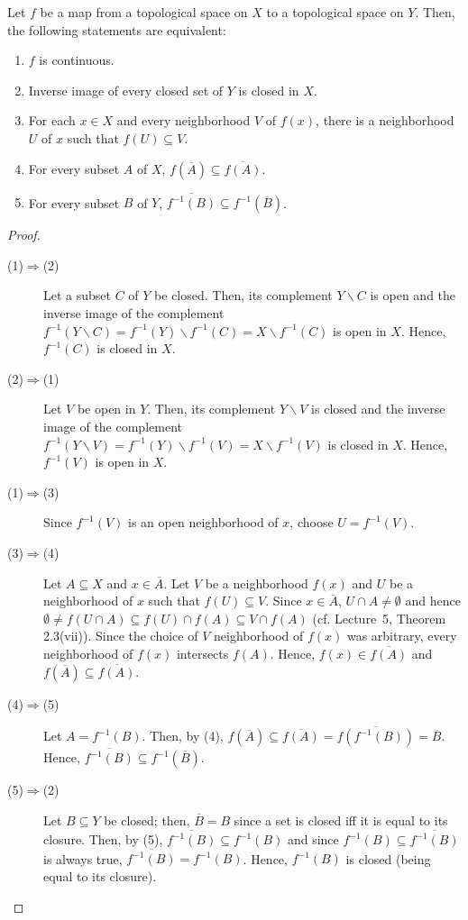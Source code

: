 \documentclass[a4paper,english,12pt]{article}
\begin{document}
\begin{thm}
Let $f$ be a map from a topological space on $X$ to a topological space on $Y$. Then, the following statements are equivalent:
\begin{enumerate}
\item $f$ is continuous.
\item Inverse image of every closed set of $Y$ is closed in $X$.
\item For each $x\in X$ and every neighborhood $V$ of $f(x)$, there is a neighborhood $U$ of $x$ such that $f(U)\subseteq V$.
\item For every subset $A$ of $X$, $f(\overline{A})\subseteq \overline{f(A)}$.
\item For every subset $B$ of $Y$, $\overline{f^{-1}(B)}\subseteq f^{-1}(\overline{B})$.
\end{enumerate}
\end{thm}
\begin{proof}
\begin{description}
\item[(1)$\Rightarrow$(2)]Let a subset $C$ of $Y$ be closed. Then, its complement $Y\backslash C$ is open and the inverse image of the complement $f^{-1}(Y\backslash C)=f^{-1}(Y)\backslash f^{-1}(C)=X\backslash f^{-1}(C)$ is open in $X$. Hence, $f^{-1}(C)$ is closed in $X$.
\item[(2)$\Rightarrow$(1)]Let $V$ be open in $Y$. Then, its complement $Y\backslash V$ is closed and the inverse image of the complement $f^{-1}(Y\backslash V)=f^{-1}(Y)\backslash f^{-1}(V)=X\backslash f^{-1}(V)$ is closed in $X$. Hence, $f^{-1}(V)$ is open in $X$.
\item[(1)$\Rightarrow$(3)]Since $f^{-1}(V)$ is an open neighborhood of $x$, choose $U=f^{-1}(V)$.
\item[(3)$\Rightarrow$(4)]Let $A\subseteq X$ and $x\in \overline{A}$. Let $V$ be a neighborhood $f(x)$ and $U$ be a neighborhood of $x$ such that $f(U)\subseteq V$. Since $x\in \overline{A}$, $U\cap A\neq \emptyset$ and hence $\emptyset\neq f(U\cap A)\subseteq f(U)\cap f(A)\subseteq V\cap f(A)$ (cf. Lecture~5, Theorem 2.3(vii)). Since the choice of $V$ neighborhood of $f(x)$ was arbitrary, every neighborhood of $f(x)$ intersects $f(A)$. Hence, $f(x)\in \overline{f(A)}$ and $f(\overline{A})\subseteq \overline{f(A)}$.
\item[(4)$\Rightarrow$(5)]Let $A=f^{-1}(B)$. Then, by (4), $f(\overline{A})\subseteq \overline{f(A)}=\overline{f(f^{-1}(B))}=\overline{B}$. Hence, $\overline{f^{-1}(B)}\subseteq f^{-1}(\overline{B})$.
\item[(5)$\Rightarrow$(2)]Let $B\subseteq Y$ be closed; then, $\overline{B}=B$ since a set is closed iff it is equal to its closure. Then, by (5), $\overline{f^{-1}(B)}\subseteq f^{-1}(B)$ and since $f^{-1}(B)\subseteq \overline{f^{-1}(B)}$ is always true, $\overline{f^{-1}(B)}=f^{-1}(B)$. Hence, $f^{-1}(B)$ is closed (being equal to its closure).
\end{description}

\end{proof}
\end{document}
